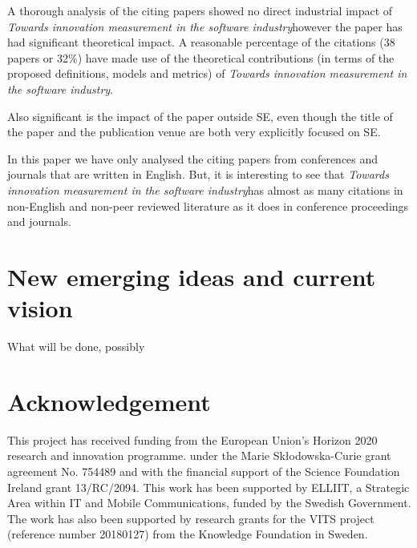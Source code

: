 \documentclass[sigplan]{acmart}
\newcommand{\theArticle}{\textit{Towards innovation measurement in the software industry}}
\begin{document}
A thorough analysis of the citing papers showed no direct industrial impact of \theArticle however the paper has had significant theoretical impact. A reasonable percentage of the citations (38 papers or 32\%) have made use of the theoretical contributions (in terms of the proposed definitions, models and metrics) of \theArticle. 

Also significant is the impact of the paper outside SE, even though the title of the paper and the publication venue are both very explicitly focused on SE.

In this paper we have only analysed the citing papers from conferences and journals that are written in English. But, it is interesting to see that \theArticle has almost as many citations in non-English and non-peer reviewed literature as it does in conference proceedings and journals. 

\section{New emerging ideas and current vision}\label{sec:fw} 
What will be done, possibly

\section*{Acknowledgement}
This project has received funding from the European Union's Horizon 2020 research and innovation programme. under the Marie Skłodowska-Curie grant agreement No. 754489 and with the financial support of the Science Foundation Ireland grant 13/RC/2094. This work has been supported by ELLIIT, a Strategic Area within IT and Mobile Communications, funded by the Swedish Government. The work has also been supported by research grants for the VITS project (reference number 20180127) from the Knowledge Foundation in Sweden.









\end{document}
